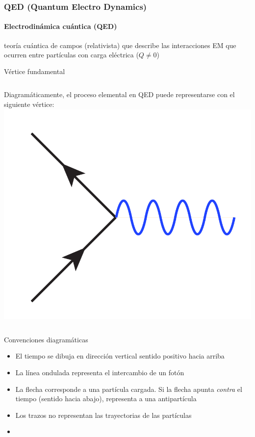 \documentclass[xetex,mathserif,serif,10pt]{beamer}
\begin{document}
\begin{frame}
  \frametitle{QED (Quantum Electro Dynamics)}
  \framesubtitle{\alert{Electrodinámica cuántica (QED)}}
  teoría cuántica de campos (relativista) que describe las interacciones EM que ocurren entre partículas con carga eléctrica ($Q \neq 0$)
  \begin{alertblock}{Vértice fundamental}
    \begin{columns}
      \large{Diagramáticamente, el proceso elemental en QED puede representarse con el siguiente vértice:}
      {\hspace{-0.5cm}\includegraphics[width=1.15\columnwidth]{./figs/u01/qed-vertex.png}}
    \end{columns}
  \end{alertblock}
  \begin{block}{Convenciones diagramáticas}
    \begin{itemize}
      \item El tiempo se dibuja en dirección vertical sentido positivo hacia arriba
      \item La línea ondulada representa el intercambio de un fotón
      \item La flecha corresponde a una partícula cargada. Si la flecha apunta {\emph{contra}} el tiempo (sentido hacia abajo), representa a una antipartícula
      \item Los trazos no representan las trayectorias de las partículas
      \item {\bf \color{chart12}{En los vértices no pueden violarse las leyes de conservación}}
    \end{itemize}
  \end{block}
\end{frame}
\end{document}
